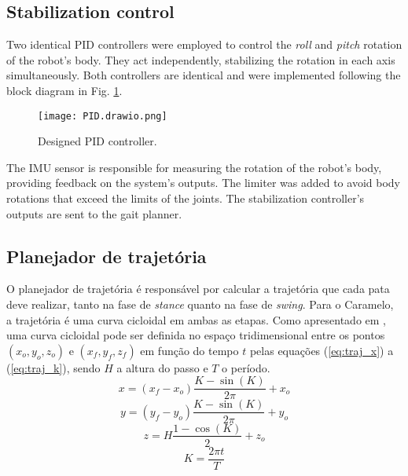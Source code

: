 \documentclass[conference]{IEEEtran}
\begin{document}
\subsection{Stabilization control}

Two identical PID controllers were employed to control the \textit{roll} and \textit{pitch} rotation of the robot's body. They act independently, stabilizing the rotation in each axis simultaneously. Both controllers are identical and were implemented following the block diagram in Fig. \ref{fig:pid}.

\begin{figure}[htbp]
  \centering
  \texttt{[image: PID.drawio.png]}
  \caption{Designed PID controller.}
  \label{fig:pid}
\end{figure}

The IMU sensor is responsible for measuring the rotation of the robot's body, providing feedback on the system's outputs. The limiter was added to avoid body rotations that exceed the limits of the joints. The stabilization controller's outputs are sent to the gait planner.

\subsection{Planejador de trajetória}

O planejador de trajetória é responsável por calcular a trajetória que cada pata deve realizar, tanto na fase de \textit{stance} quanto na fase de \textit{swing}. Para o Caramelo, a trajetória é uma curva cicloidal em ambas as etapas. Como apresentado em \cite{Shi2021}, uma curva cicloidal pode ser definida no espaço tridimensional entre os pontos $(x_o, y_o, z_o)$ e $(x_f, y_f, z_f)$ em função do tempo $t$ pelas equações (\ref{eq:traj_x}) a (\ref{eq:traj_k}), sendo $H$ a altura do passo e $T$ o período.
\begin{equation}
  x = (x_f - x_o) \frac{K - \sin{(K)}}{2 \pi} + x_o
  \label{eq:traj_x}
\end{equation}
\begin{equation}
  y = (y_f - y_o) \frac{K - \sin{(K)}}{2 \pi} + y_o
  \label{eq:traj_y}
\end{equation}
\begin{equation}
  z = H \frac{1 - \cos{(K)}}{2} + z_o
  \label{eq:traj_z}
\end{equation}
\begin{equation}
  K = \frac{2 \pi t}{T}
  \label{eq:traj_k}
\end{equation}
\end{document}
